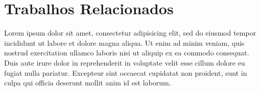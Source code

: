 \section{Trabalhos Relacionados}

Lorem ipsum dolor sit amet, consectetur adipisicing elit, sed do eiusmod tempor incididunt ut labore et dolore magna aliqua. Ut enim ad minim veniam, quis nostrud exercitation ullamco laboris nisi ut aliquip ex ea commodo consequat. Duis aute irure dolor in reprehenderit in voluptate velit esse cillum dolore eu fugiat nulla pariatur. Excepteur sint occaecat cupidatat non proident, sunt in culpa qui officia deserunt mollit anim id est laborum.

\label{sec:similares}
